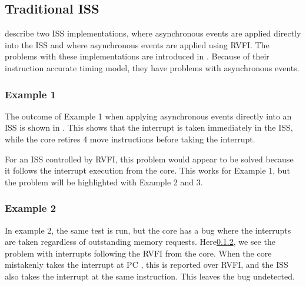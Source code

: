 
\subsection{Traditional ISS}

\textcite{taylorAdvancedRISCVVerification2023} describe two ISS implementations, where asynchronous events are applied directly into the ISS and where asynchronous events are applied using RVFI. The problems with these implementations are introduced in .
Because of their instruction accurate timing model, they have problems with asynchronous events. 



\subsubsection{Example 1}

The outcome of Example 1 when applying asynchronous events directly into an ISS is shown in . This shows that the interrupt is taken immediately in the ISS, while the core retires 4 move instructions before taking the interrupt.

For an ISS controlled by RVFI, this problem would appear to be solved because it follows the interrupt execution from the core. This works for Example 1, but the problem will be highlighted with Example 2 and 3.

\subsubsection{Example 2}
In example 2, the same test is run, but the core has a bug where the interrupts are taken regardless of outstanding memory requests. Here\ref{}, we see the problem with interrupts following the RVFI from the core. When the core mistakenly takes the interrupt at PC , this is reported over RVFI, and the ISS also takes the interrupt at the same instruction. This leaves the bug undetected.

